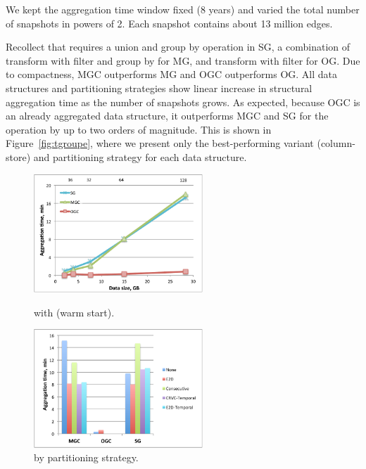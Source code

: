 We kept the aggregation time window fixed (8 years) and varied the
total number of snapshots in powers of 2.  Each snapshot contains
about 13 million edges.

Recollect that  requires a union and group by operation
in SG, a combination of transform with filter and group by for MG, and
transform with filter for OG.  Due to compactness, MGC outperforms MG
and OGC outperforms OG.  All data structures and partitioning
strategies show linear increase in structural aggregation time as the
number of snapshots grows.  As expected, because OGC is an already
aggregated data structure, it outperforms MGC and SG for the
 operation by up to two orders of magnitude.  This is
shown in Figure~\ref{fig:tgroupe}, where we present only the
best-performing variant (column-store) and partitioning strategy for
each data structure.

\begin{figure}[t!]
\centering
\begin{minipage}{3in}
  \centering
  \includegraphics[width=2.5in]{figs/tgroupe_warm.pdf}
\vspace{-0.1in}
  \caption{ with  (warm start).}
  \label{fig:tgroupe}
\vspace{-0.1in}
\end{minipage}
\begin{minipage}{3in}
  \centering
  \includegraphics[width=2.5in]{figs/tgroupeparts.pdf}
\vspace{-0.1in}
  \caption{ by partitioning strategy.}
  \label{fig:tgroupeparts}
\vspace{-0.1in}
\end{minipage}
\end{figure}

